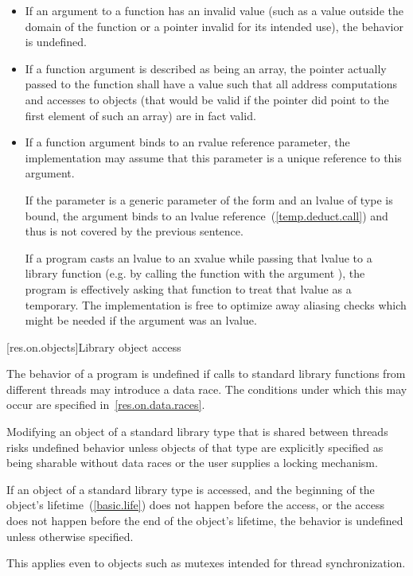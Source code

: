 \begin{itemize}
\item
If an argument to a function has an invalid value (such
%
as a value outside the domain of the function or a pointer invalid for its
intended use), the behavior is undefined.
%

\item
If a function argument is described as being an array,
%
the pointer actually passed to the function shall have a value such that all
address computations and accesses to objects (that would be valid if the
pointer did point to the first element of such an array) are in fact valid.

\item
If a function argument binds to an rvalue reference parameter, the implementation may
assume that this parameter is a unique reference to this argument.
\begin{note}
If the parameter is a generic parameter of the form  and an lvalue of type
 is bound, the argument binds to an lvalue reference~(\ref{temp.deduct.call})
and thus is not covered by the previous sentence. \end{note} \begin{note} If a program casts
an lvalue to an xvalue while passing that lvalue to a library function (e.g. by calling the function
with the argument ), the program
is effectively asking that function to treat that lvalue as a temporary. The implementation
is free to optimize away aliasing checks which might be needed if the argument was
an lvalue. \end{note}
\end{itemize}

[res.on.objects]{Library object access}

\pnum
The behavior of a program is undefined if calls to standard library functions from different
threads may introduce a data race. The conditions under which this may occur are specified
in~\ref{res.on.data.races}. \begin{note} Modifying an object of a standard library type that is
shared between threads risks undefined behavior unless objects of that type are explicitly
specified as being sharable without data races or the user supplies a locking mechanism. \end{note}

\pnum
If an object of a standard library type is accessed, and
the beginning of the object's lifetime~(\ref{basic.life})
does not happen before the access, or
the access does not happen before the end of the object's lifetime,
the behavior is undefined unless otherwise specified.
\begin{note}
This applies even to objects such as mutexes intended for thread synchronization.
\end{note}

